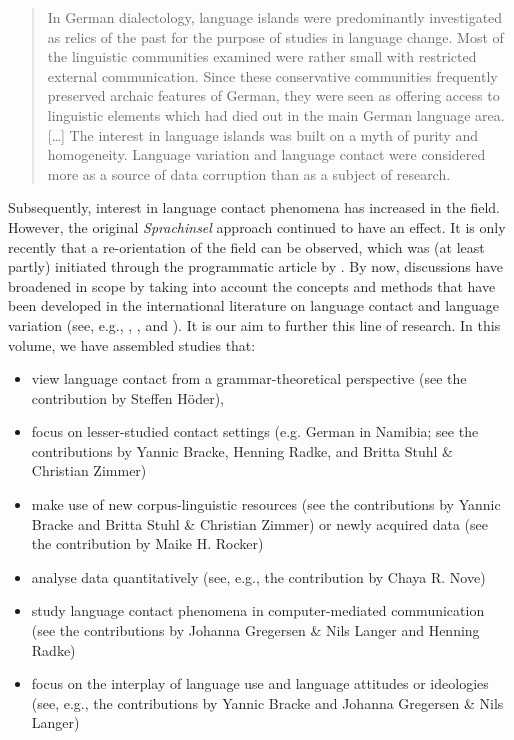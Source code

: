 \documentclass[output=paper]{langsci/langscibook}
\begin{document}
\begin{quote}
In German dialectology, language islands were predominantly investigated as relics of the past for the purpose of studies in language change. Most of the linguistic communities examined were rather small with restricted external communication. Since these conservative communities frequently preserved archaic features of German, they were seen as offering access to linguistic elements which had died out in the main German language area. […] The interest in language islands was built on a myth of purity and homogeneity. Language variation and language contact were considered more as a source of data corruption than as a subject of research. \citep[222–223]{rosenberg_dialect_2005}
\end{quote}

Subsequently, interest in language contact phenomena has increased in the field. However, the original \textit{Sprachinsel} approach continued to have an effect. It is only recently that a re-orientation of the field can be observed, which was (at least partly) initiated through the programmatic article by \citet{mattheier_theorie_1994}. By now, discussions have broadened in scope by taking into account the concepts and methods that have been developed in the international literature on language contact and language variation (see, e.g., \citealt{putnam_studies_2011}, \citealt{page_moribund_2015}, and \citealt{boas_constructions_2018}). It is our aim to further this line of research. In this volume, we have assembled studies that:
\begin{itemize}
\item view language contact from a grammar-theoretical perspective (see the contribution by Steffen Höder),
\item focus on lesser-studied contact settings (e.g. German in Namibia; see the contributions by Yannic Bracke, Henning Radke, and Britta Stuhl \& Christian Zimmer) 
\item make use of new corpus-linguistic resources (see the contributions by Yannic Bracke and Britta Stuhl \& Christian Zimmer) or newly acquired data (see the contribution by Maike H. Rocker)
\item analyse data quantitatively (see, e.g., the contribution by Chaya R. Nove)
\item study language contact phenomena in computer-mediated communication (see the contributions by Johanna Gregersen \& Nils Langer and Henning Radke)
\item focus on the interplay of language use and language attitudes or ideologies (see, e.g., the contributions by Yannic Bracke and Johanna Gregersen \& Nils Langer)
\end{itemize}
\end{document}
